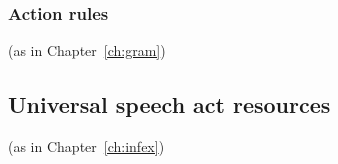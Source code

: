 \subsubsection{Action rules} (as in Chapter~\ref{ch:gram})


  










\subsection{Universal speech act resources} (as in Chapter~\ref{ch:infex})


  


